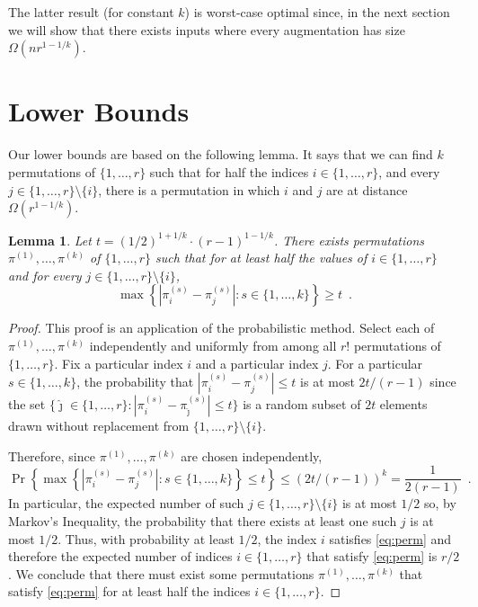 \documentclass{patmorin}
\newtheorem{lemma}[theorem]{Lemma}
\begin{document}
The latter result (for constant $k$) is worst-case optimal since, in the next section we will show that there exists inputs where every augmentation has size $\Omega(nr^{1-1/k})$.


\section{Lower Bounds}\label{section:Lower bound}

Our lower bounds are based on the following lemma. It says that we can find $k$ permutations of $\{1,\ldots,r\}$ such that for half the indices $i\in\{1,\ldots,r\}$, and every $j\in\{1,\ldots,r\}\setminus\{i\}$, there is a permutation in which $i$ and $j$ are at distance $\Omega(r^{1-1/k})$.

\begin{lemma}\label{lem:permutations}
Let $t=(1/2)^{1+1/k}\cdot(r-1)^{1-1/k}$.  There exists permutations $\pi^{(1)},\ldots,\pi^{(k)}$ of $\{1,\ldots,r\}$ such that for at least half the values of $i\in\{1,\ldots,r\}$ and for every $j\in\{1,\ldots,r\}\setminus\{i\}$,
\begin{equation}
 \max\left\{\left|\pi^{(s)}_i-\pi^{(s)}_j\right|\colon s\in\{1,\ldots,k\} \right\}
 \ge t \enspace .
     \label{eq:perm}
\end{equation}
\end{lemma}

\begin{proof}
  This proof is an application of the probabilistic method.  Select each
  of $\pi^{(1)},\ldots,\pi^{(k)}$ independently and uniformly from among
  all $r!$ permutations of $\{1,\ldots,r\}$.  Fix a particular index $i$
  and a particular index $j$.  For a particular $s\in\{1,\ldots,k\}$, the
  probability that $|\pi^{(s)}_i-\pi^{(s)}_j|\le t$ is at most $2t/(r-1)$
  since the set
  $\{\hat \jmath\in\{1,\ldots,r\} \colon |\pi^{(s)}_i-\pi^{(s)}_{\hat
   \jmath}|\le t\}$ is a random subset of $2t$ elements drawn without
  replacement from $\{1,\ldots,r\}\setminus \{i\}$.

  Therefore, since $\pi^{(1)},\ldots,\pi^{(k)}$ are chosen independently, 
  \[
    \Pr\left\{\max\left\{\left|\pi^{(s)}_i-\pi^{(s)}_j\right|\colon s\in\{1,\ldots,k\} \right\}\le t\right\} \le (2t/(r-1))^k = \frac{1}{2(r-1)} \enspace .
  \]
  In particular, the expected number of such
  $j\in\{1,\ldots,r\}\setminus\{i\}$ is at most $1/2$ so, by Markov's
  Inequality, the probability that there exists at least one such $j$
  is at most $1/2$.  Thus, with probability at least $1/2$, the index $i$
  satisfies \eqref{eq:perm} and therefore the expected number of indices $i\in\{1,\ldots,r\}$
  that satisfy \eqref{eq:perm} is $r/2$.  We conclude that there must exist
  some permutations $\pi^{(1)},\ldots,\pi^{(k)}$ that satisfy \eqref{eq:perm}
  for at least half the indices $i\in\{1,\ldots,r\}$.
\end{proof}
\end{document}
